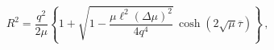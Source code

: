 \begin{equation}
R^2=\frac{q^2}{2\mu}\left\{1+\sqrt{1-\frac{\mu\ell^2(\Delta\mu)^2}{4q^4}}\,
\cosh\left(2\sqrt{\mu}\overline{\tau}\right)\right\}\,,\end{equation}

